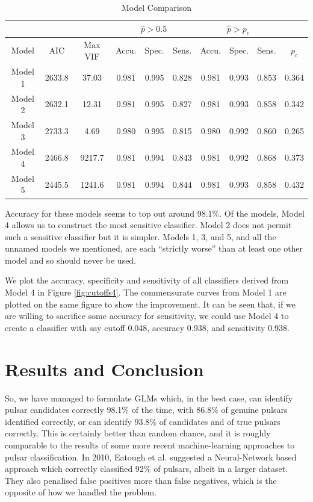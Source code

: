 \documentclass[11pt, oneside]{article}
\begin{document}
\begin{table}[h!]
\centering
\begin{tabular}{|c | c c |c c c |c c c|c|} 
\multicolumn{3}{c}{}      &\multicolumn{3}{c}{$\hat{p} > 0.5$}&
						       \multicolumn{3}{c}{$\hat{p} > p_c$}& \multicolumn{1}{c}{} \\
\hline
Model   & AIC    & Max VIF& Accu. & Spec. & Sens. & Accu. & Spec. & Sens. & $p_c$ \\
\hline \hline
Model 1 & 2633.8 & 37.03  & 0.981 & 0.995 & 0.828 & 0.981 & 0.993 & 0.853 & 0.364\\ 
Model 2 & 2632.1 & 12.31  & 0.981 & 0.995 & 0.827 & 0.981 & 0.993 & 0.858 & 0.342\\
Model 3 & 2733.3 & 4.69   & 0.980 & 0.995 & 0.815 & 0.980 & 0.992 & 0.860 & 0.265\\
Model 4 & 2466.8 & 9217.7 & 0.981 & 0.994 & 0.843 & 0.981 & 0.992 & 0.868 & 0.373\\
Model 5 & 2445.5 & 1241.6 & 0.981 & 0.994 & 0.844 & 0.981 & 0.993 & 0.858 & 0.432\\
\hline
\end{tabular}
\caption{Model Comparison}
\label{table:models}
\end{table}

Accuracy for these models seems to top out around 98.1\%. Of the models, Model 4 allows us to construct the most sensitive classifier. Model 2 does not permit such a sensitive classifier but it is simpler. Models 1, 3, and 5, and all the unnamed models we mentioned, are each ``strictly worse'' than at least one other model and so should never be used. 

We plot the accuracy, specificity and sensitivity of all classifiers derived from Model 4 in Figure \ref{fig:cutoffs4}. The commensurate curves from Model 1 are plotted on the same figure to show the improvement. It can be seen that, if we are willing to sacrifice some accuracy for sensitivity, we could use Model 4 to create a classifier with say cutoff 0.048, accuracy 0.938, and sensitivity 0.938. 

\section{Results and Conclusion}

So, we have managed to formulate GLMs which, in the best case, can identify pulsar candidates correctly 98.1\% of the time, with 86.8\% of genuine pulsars identified correctly, or can identify 93.8\% of candidates and of true pulsars correctly. This is certainly better than random chance, and it is roughly comparable to the results of some more recent machine-learning approaches to pulsar classification. In 2010, Eatough et al. \cite{eatough} suggested a Neural-Network based approach which correctly classified 92\% of pulsars, albeit in a larger dataset. They also penalised false positives more than false negatives, which is the opposite of how we handled the problem.  
\end{document}
